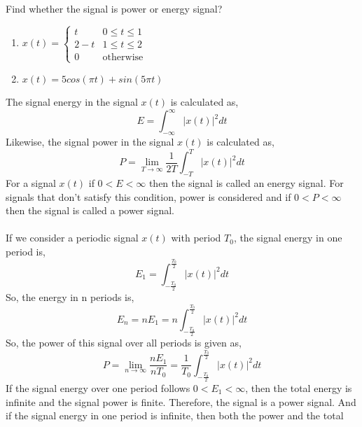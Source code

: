 \documentclass{article}[12 pt]
\begin{document}
\begin{problem}
{Find whether the signal is power or energy signal?
\begin{enumerate}
\item 
$x(t)=\begin{cases}
  t & 0 \leq t \leq 1\\
  2-t & 1 \leq t \leq 2\\
  0 & \text{otherwise}
\end{cases}$
\item $x(t)=5cos(\pi t) + sin (5 \pi t)$
\end{enumerate}
}
\end{problem}
\begin{solution}{
The signal energy in the signal $x(t)$ is calculated as,
\begin{equation}
\label{eqn:energysignal}
E=\int_{-\infty}^\infty |x(t)|^2 dt
\end{equation}
Likewise, the signal power in the signal $x(t)$ is calculated as,
\begin{equation}
\label{eqn:powersignal}
P=\lim_{T \to \infty}
\frac{1}{2T}\int_{-T}^T |x(t)|^2 dt
\end{equation}
For a signal $x(t)$ if $0<E<\infty$ then the signal is called an energy signal. For signals that don't satisfy this condition, power is considered and if $0<P<\infty$ then the signal is called a power signal.\\\\If we consider a periodic signal $x(t)$ with period $T_0$, the signal energy in one period is,
\begin{equation}
\label{eqn:energyoneperiod}
E_1=\int_{-\frac{T_0}{2}}^{\frac{T_0}{2}}|x(t)|^2 dt
\end{equation}
So, the energy in n periods is,
\begin{equation}
\label{eqn:energynperiod}
E_n=nE_1=n\int_{-\frac{T_0}{2}}^{\frac{T_0}{2}}|x(t)|^2 dt
\end{equation}
So, the power of this signal over all periods is given as,
\begin{equation}
\label{eqn:powernperiod}
P=\lim_{n \to \infty}\frac{nE_1}{nT_0}=\frac{1}{T_0}\int_{-\frac{T_0}{2}}^{\frac{T_0}{2}}|x(t)|^2 dt
\end{equation}
If the signal energy over one period follows $0<E_1<\infty$, then the total
energy is infinite and the signal power is finite. Therefore, the signal is a power
signal. And if the signal energy in one period is infinite, then both the power and the total
}
\end{solution}
\end{document}
